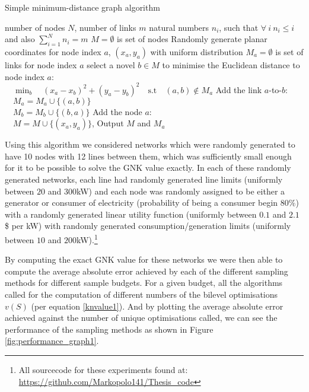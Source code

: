 \begin{algorithm}[]
\caption{Simple minimum-distance graph algorithm}
\label{alg1}
\begin{algorithmic}
    \REQUIRE number of nodes $N$, number of links $m$
    \REQUIRE natural numbers $n_i$, such that $\forall~i~n_i\leq i$ and also $\sum_{i=1}^Nn_i=m$
    \STATE $M=\emptyset$ is set of nodes
        \STATE Randomly generate planar coordinates for node index $a$, $(x_a ,y_a)$ with uniform distribution
        \STATE $M_a=\emptyset$ is set of links for node index $a$
            \STATE select a novel $b\in M$ to minimise the Euclidean distance to node index $a$:\\ $\quad\min_b\quad (x_a-x_b)^2+(y_a-y_b)^2\quad\text{s.t}\quad (a, b)\notin M_a$
            \STATE Add the link $a$-to-$b$:\\ $\quad M_a=M_a\cup \{(a, b)\}$\\ $\quad M_b=M_b\cup \{(b, a)\}$
        \ENDFOR
        \STATE Add the node $a$:\\ $\quad M=M\cup \{(x_a ,y_a)\}$, 
    \ENDFOR
    \STATE Output $M$ and $M_a$ 
\end{algorithmic}
\end{algorithm}

Using this algorithm we considered networks which were randomly generated to have 10 nodes with 12 lines between them, which was sufficiently small enough for it to be possible to solve the GNK value exactly.
In each of these randomly generated networks, each line had randomly generated line limits (uniformly between $20$ and $300$kW) and each node was randomly assigned to be either a generator or consumer of electricity (probability of being a consumer begin $80\%$) with a randomly generated linear utility function (uniformly between $0.1$ and $2.1$ \$ per kW) with randomly generated consumption/generation limits (uniformly between $10$ and $200$kW).\footnote{All sourcecode for these experiments found at: \href{https://github.com/Markopolo141/Thesis\_code}{https://github.com/Markopolo141/Thesis\_code}}

By computing the exact GNK value for these networks we were then able to compute the average absolute error achieved by each of the different sampling methods for different sample budgets.
For a given budget, all the algorithms called for the computation of different numbers of the bilevel optimisations $v(S)$ (per equation \ref{knvalue1}).
And by plotting the average absolute error achieved against the number of unique optimisations called, we can see the performance of the sampling methods as shown in Figure \ref{fig:performance_graph1}.

